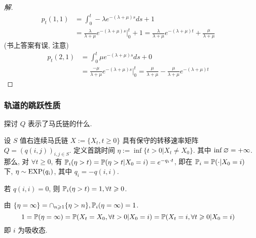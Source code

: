 \begin{proof}[解]
\[    \]
    \[
    \begin{aligned}
        p_t(1,1)&=\int_0^t -\lambda e^{-(\lambda +\mu)s}ds+1\\
        &=\frac{\lambda}{\lambda +\mu}e^{-(\lambda+\mu)s}\bigg|_0^t+1=\frac{\lambda}{\lambda+\mu}e^{-(\lambda+\mu)t}+\frac{\mu}{\lambda+\mu}
    \end{aligned}
    \]
    (书上答案有误, 注意)
    \[
    \begin{aligned}
        p_t(2,1)&=\int_0^t \mu e^{-(\lambda +\mu)s}ds+0\\
        &=\frac{-\mu}{\lambda +\mu}e^{-(\lambda+\mu)s}\bigg|_0^t=\frac{\mu}{\lambda+\mu}-\frac{\mu}{\lambda+\mu}e^{-(\lambda+\mu)t}
    \end{aligned}
    \]
\end{proof}

\subsubsection{轨道的跳跃性质}

探讨 $Q$ 表示了马氏链的什么.

\begin{theorem}\label{thm:p127-thm5}
    设 $S$ 值右连续马氏链 $X:=\{X_t,t\geq 0\}$ 具有保守的转移速率矩阵 $Q=(q(i,j))_{i,j\in S}$. 定义首跳时间 $\eta:=\inf \{t>0|X_t\neq X_0\}$. 其中 $\inf \varnothing=+\infty$. 那么, 对 $\forall t\geq 0$, 有 $\mathbb{P}_i(\eta>t)=\mathbb{P}(\eta>t|X_0=i)=e^{-q_i\cdot t}$, 即在 $\mathbb{P}_i=\mathbb{P}(\cdot|X_0=i)$ 下, $\eta\sim \operatorname{EXP}(q_i)$, 其中 $q_i=-q(i,i)$.
\end{theorem}

\begin{corollary}
    若 $q(i,i)=0$, 则 $\mathbb{P}_i(\eta>t)=1, \forall t\geqslant 0$. 
\end{corollary}
由 $\{\eta=\infty\}=\cap_{n\geqslant 1}\{\eta >n\}, \mathbb{P}_i(\eta=\infty)=1$.
\[
    1=\mathbb{P}(\eta=\infty)=\mathbb{P}(X_t=X_0,\forall t>0|X_0=i)=\mathbb{P}(X_t=i,\forall t\geqslant 0|X_0=i)
\]
即 $i$ 为吸收态.


